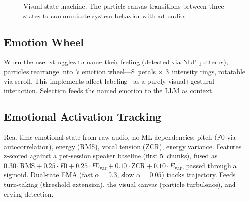 \documentclass{article}
\begin{document}
\begin{figure}[h]
\centering
{}
\caption{Visual state machine. The particle canvas transitions between three states to communicate system behavior without audio.}
\label{fig:vsm}
\end{figure}

\subsection{Emotion Wheel}

When the user struggles to name their feeling (detected via NLP patterns), particles rearrange into \citet{plutchik1980general}'s emotion wheel---8~petals $\times$ 3~intensity rings, rotatable via scroll. This implements affect labeling~\citep{lieberman2007putting} as a purely visual+gestural interaction. Selection feeds the named emotion to the LLM as context.

\subsection{Emotional Activation Tracking}

Real-time emotional state from raw audio, no ML dependencies: pitch (F0 via autocorrelation), energy (RMS), vocal tension (ZCR), energy variance. Features z-scored against a per-session speaker baseline (first 5~chunks), fused as $0.30 \cdot \text{RMS} + 0.25 \cdot F0 + 0.25 \cdot F0_\text{var} + 0.10 \cdot \text{ZCR} + 0.10 \cdot E_\text{var}$, passed through a sigmoid. Dual-rate EMA (fast $\alpha = 0.3$, slow $\alpha = 0.05$) tracks trajectory. Feeds turn-taking (threshold extension), the visual canvas (particle turbulence), and crying detection.
\end{document}
